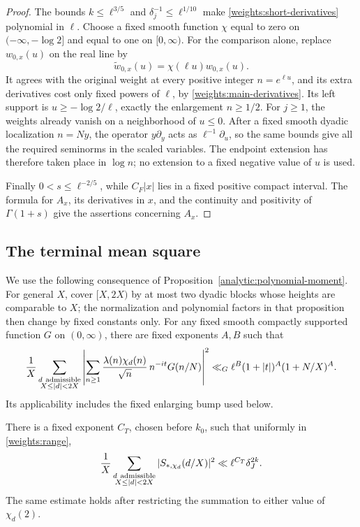 \begin{proof}
The bounds \(k\le\ell^{3/5}\) and
\(\delta_j^{-1}\le\ell^{1/10}\) make
\eqref{weights:short-derivatives} polynomial in \(\ell\).
Choose a fixed smooth function \(\chi\) equal to zero on
\((-\infty,-\log2]\) and equal to one on \([0,\infty)\).
For the comparison alone, replace \(w_{0,x}(u)\) on the real line
by
\[
 \widetilde w_{0,x}(u)=\chi(\ell u)w_{0,x}(u).
\]
It agrees with the original weight at every positive integer
\(n=e^{\ell u}\), and its extra derivatives cost only fixed powers
of \(\ell\), by \eqref{weights:main-derivatives}. Its left support
is \(u\ge-\log2/\ell\), exactly the enlargement \(n\ge1/2\).
For \(j\ge1\), the weights already vanish on a neighborhood of
\(u\le0\). After a fixed smooth dyadic localization \(n=Ny\),
the operator \(y\partial_y\) acts as \(\ell^{-1}\partial_u\), so
the same bounds give all the required seminorms in the scaled
variables. The endpoint extension has therefore taken place in
\(\log n\); no extension to a fixed negative value of \(u\) is used.

Finally \(0<s\le\ell^{-2/5}\), while \(C_F|x|\) lies in a fixed
positive compact interval. The formula for \(A_x\), its derivatives
in \(x\), and the continuity and positivity of \(\Gamma(1+s)\)
give the assertions concerning \(A_x\).
\end{proof}

\subsection{The terminal mean square}

We use the following consequence of Proposition~\ref{analytic:polynomial-moment}.
For general $X$, cover $[X,2X)$ by at most two dyadic blocks whose
heights are comparable to $X$; the normalization and polynomial factors
in that proposition then change by fixed constants only.
For any fixed smooth compactly supported function \(G\) on
\((0,\infty)\), there are fixed
exponents \(A,B\) such that
\begin{equation}
 \frac1X\sum_{\substack{d\ {\rm admissible}\\X\le|d|<2X}}
 \left|\sum_{n\ge1}\frac{\lambda(n)\chi_d(n)}{\sqrt n}\,
                         n^{-it}G(n/N)\right|^2
 \ll_G \ell^B(1+|t|)^A(1+N/X)^A.
 \label{weights:moment-interface}
\end{equation}
Its applicability includes the fixed enlarging bump used below.

\begin{proposition}
\label{weights:terminal}
There is a fixed exponent \(C_T\), chosen before \(k_0\), such that
uniformly in \eqref{weights:range},
\begin{equation}
 \frac1X\sum_{\substack{d\ {\rm admissible}\\X\le|d|<2X}}
       |S_{*,\chi_d}(d/X)|^2
       \ll \ell^{C_T}\delta_J^{2k}.
 \label{weights:terminal-square}
\end{equation}
The same estimate holds after restricting the summation to either
value of \(\chi_d(2)\).
\end{proposition}

